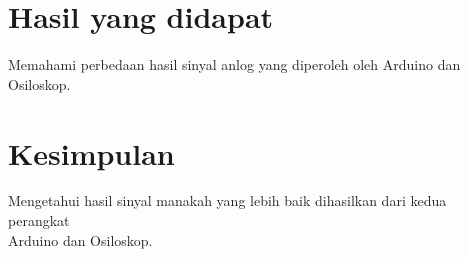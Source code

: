 \section{Hasil yang didapat}
Memahami perbedaan hasil sinyal anlog yang diperoleh oleh Arduino dan Osiloskop.

\section{Kesimpulan}
Mengetahui hasil sinyal manakah yang lebih baik dihasilkan dari kedua perangkat \\Arduino dan Osiloskop.
